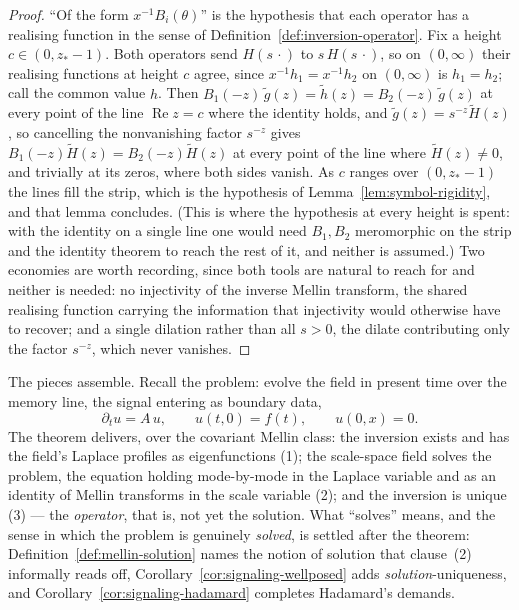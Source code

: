 \begin{proof}
``Of the form $x^{-1}B_i(\theta)$'' is the hypothesis that each operator has a realising
function in the sense of Definition~\ref{def:inversion-operator}. Fix a height
$c \in (0, z_* - 1)$. Both operators send $H(s\,\cdot)$ to $s\,H(s\,\cdot)$, so on $(0,\infty)$
their realising functions at height $c$ agree, since $x^{-1}h_1 = x^{-1}h_2$ on $(0,\infty)$ is
$h_1 = h_2$; call the common value $h$. Then
$B_1(-z)\,\tilde g(z) = \tilde h(z) = B_2(-z)\,\tilde g(z)$ at every point of the line
$\operatorname{Re} z = c$ where the identity holds, and $\tilde g(z) = s^{-z}\tilde H(z)$, so
cancelling the nonvanishing factor $s^{-z}$ gives $B_1(-z)\tilde H(z) = B_2(-z)\tilde H(z)$ at
every point of the line where $\tilde H(z) \ne 0$, and trivially at its zeros, where both sides
vanish. As $c$ ranges over $(0, z_* - 1)$ the lines fill the strip, which is the hypothesis of
Lemma~\ref{lem:symbol-rigidity}, and that lemma concludes. (This is where the hypothesis at
every height is spent: with the identity on a single line one would need $B_1, B_2$ meromorphic
on the strip and the identity theorem to reach the rest of it, and neither is assumed.) Two
economies are worth recording, since both tools are natural to reach for and neither is needed:
no injectivity of the inverse Mellin transform, the shared realising function carrying the
information that injectivity would otherwise have to recover; and a single dilation rather than
all $s > 0$, the dilate contributing only the factor $s^{-z}$, which never vanishes.
\end{proof}

The pieces assemble. Recall the problem: evolve the field in present time over the
memory line, the signal entering as boundary data,
\[
  \partial_t u = A\,u, \qquad u(t,0) = f(t), \qquad u(0,x) = 0 .
\]
The theorem delivers, over the covariant Mellin class: the inversion exists and has
the field's Laplace profiles as eigenfunctions (1); the scale-space field solves the
problem, the equation holding mode-by-mode in the Laplace variable and as an identity
of Mellin transforms in the scale variable (2); and the inversion is unique (3) ---
the \emph{operator}, that is, not yet the solution. What ``solves'' means, and the
sense in which the problem is genuinely \emph{solved}, is settled after the
theorem: Definition~\ref{def:mellin-solution} names the notion of solution that
clause~(2) informally reads off, Corollary~\ref{cor:signaling-wellposed} adds
\emph{solution}-uniqueness, and Corollary~\ref{cor:signaling-hadamard} completes
Hadamard's demands.

